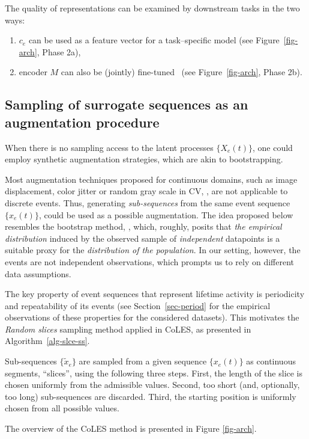 \documentclass[sigconf]{acmart}
\newcommand{\revised}[1]{#1}
\begin{document}
The quality of representations can be examined by downstream tasks in the two ways:
\begin{enumerate}
    \item $c_e$ can be used as a feature vector for a task--specific model (see Figure~\ref{fig-arch}, Phase 2a),
    \item encoder $M$ can also be (jointly) fine-tuned~\citep{Yosinski2014HowTA} (see Figure~\ref{fig-arch}, Phase 2b).
\end{enumerate}

\subsection{Sampling of surrogate sequences as an augmentation procedure} \label{sec-pos-pairs}

When there is no sampling access to the latent processes $\{X_e(t)\}$, one could employ synthetic
augmentation strategies, which are akin to bootstrapping.
\revised{
Most augmentation techniques proposed
for continuous domains, such as image displacement, color jitter or random gray scale in CV, \citep{Falcon2020AFF},
are not applicable to discrete events. Thus, generating \emph{sub-sequences} from the same event
sequence $\{x_e(t)\}$, could be used as a possible augmentation.
%
The idea proposed below resembles the bootstrap method, \citep{Efron1994Bootstrap}, which, roughly,
posits that \emph{the empirical distribution} induced by the observed sample of \emph{independent}
datapoints is a suitable proxy for the \emph{distribution of the population}.
% 
In our setting, however, the events are not independent observations, which prompts us to
rely on different data assumptions.
}

The key property of event sequences that represent lifetime activity is periodicity and repeatability
of its events (see Section~\ref{sec-period} for the empirical observations of these properties
for the considered datasets). This motivates the \emph{Random slices} sampling method applied
in CoLES, as presented in Algorithm~\ref{alg-slce-ss}.
\revised{
    Sub-sequences $\{\tilde{x}_e\}$ are sampled
    from a given sequence $\{x_e(t)\}$ as continuous segments, ``slices'', using the following three steps.
    First, the length of the slice is chosen uniformly from the admissible values.
    Second, too short (and, optionally, too long) sub-sequences are discarded.
    Third, the starting position is uniformly chosen from all possible values.
}
The overview of the CoLES method is presented in Figure \ref{fig-arch}.
\end{document}
